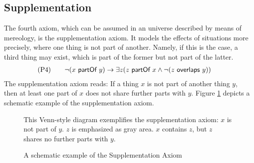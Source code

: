 \subsection{Supplementation}
\label{subsection:Supplementation}
The fourth axiom, which can be assumed in an universe described by means of mereology, is the supplementation axiom.
It models the effects of situations more precisely, where one thing is not part of another.
Namely, if this is the case, a third thing may exist, which is part of the former but not part of the latter.
\begin{align}
&\text{(P4)}
\qquad
\neg(x ~\textsf{partOf}~ y) \rightarrow \exists z (z ~\textsf{partOf}~ x \wedge \neg(z ~\textsf{overlaps}~ y))
\end{align}
The supplementation axiom reads:
If a thing $x$ is not part of another thing $y$, then at least one part of $x$ does not share further parts with $y$.
Figure \ref{figure:SupplementaitonAxiomExample} depicts a schematic example of the supplementation axiom.

\begin{figure}[h!]
\begin{center}
\end{center}
{
\scriptsize 
This Venn-style diagram exemplifies the supplementation axiom:
$x$ is not part of $y$.
$z$ is emphasized as gray area.
$x$ contains $z$, but $z$ shares no further parts with $y$.
}
\caption{A schematic example of the Supplementation Axiom}
\label{figure:SupplementaitonAxiomExample}
\end{figure}


